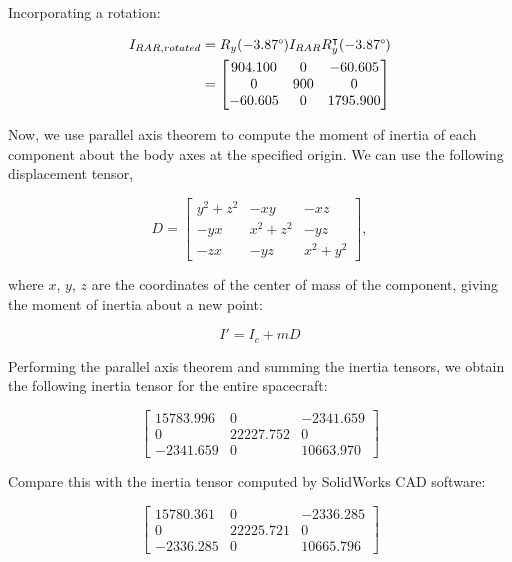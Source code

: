 Incorporating a rotation:

\begin{align*}
I_{RAR,rotated} &= R_{y}(-3.87\degree) I_{RAR} R_{y}^{\intercal}(-3.87\degree) \\
&=
\begin{bmatrix}
904.100 & 0 & -60.605 \\
0 & 900 & 0 \\
-60.605 & 0 & 1795.900
\end{bmatrix}
\end{align*}

Now, we use parallel axis theorem to compute the moment of inertia of each component about the body axes at the specified origin. We can use the following displacement tensor,

\begin{equation*}
D =
\begin{bmatrix}
y^{2} + z^{2} & -xy & -xz \\
-yx & x^{2} + z^{2} & -yz \\
-zx & -yz & x^{2} + y^{2}
\end{bmatrix},
\end{equation*}

where $x$, $y$, $z$ are the coordinates of the center of mass of the component, giving the moment of inertia about a new point:

\begin{equation*}
    I' = I_{c} + mD
\end{equation*}

Performing the parallel axis theorem and summing the inertia tensors, we obtain the following inertia tensor for the entire spacecraft:

\begin{equation*}
\begin{bmatrix}
15783.996 & 0 & -2341.659 \\
0 & 22227.752 & 0 \\
-2341.659 & 0 & 10663.970
\end{bmatrix}
\end{equation*}

Compare this with the inertia tensor computed by SolidWorks CAD software:

\begin{equation*}
\begin{bmatrix}
15780.361 & 0 & -2336.285 \\
0 & 22225.721 & 0 \\
-2336.285 & 0 & 10665.796
\end{bmatrix}
\end{equation*}

